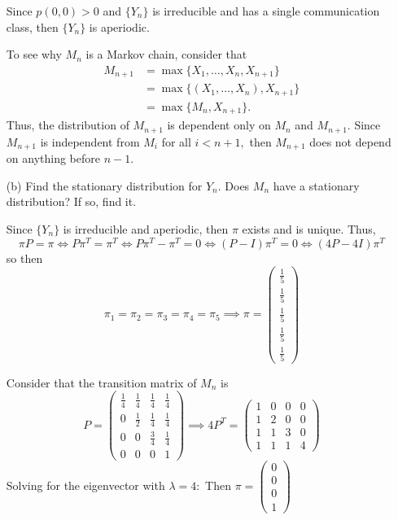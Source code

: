 \documentclass[11pt]{article}
\begin{document}
\begin{enumerate}
\begin{solution}
    Since $p(0,0) > 0$ and $\{Y_n\}$ is irreducible and has a single communication class, then $\{Y_n\}$ is aperiodic. 

    To see why $M_n$ is a Markov chain, consider that 
    \begin{align*}
        M_{n+1} &= \max\{X_1, \dots, X_{n}, X_{n+1}\}\\
        &= \max\{(X_1, \dots, X_{n}), X_{n+1}\}\\
        &= \max\{M_n, X_{n+1}\}.
    \end{align*}
    Thus, the distribution of $M_{n+1}$ is dependent only on $M_n$ and $M_{n+1}.$ Since $M_{n+1}$ is independent from $M_{i}$ for all $i< n+1,$ then $M_{n+1}$ does not depend on anything before $n-1.$ 
    
\end{solution}

    \item[(b)] Find the stationary distribution for $Y_n$. Does $M_n$ have a stationary distribution? If so, find it.
\begin{solution}
    Since $\{Y_n\}$ is irreducible and aperiodic, then $\pi$ exists and is unique. Thus, 
    \[\pi P = \pi \iff P \pi^T = \pi^T \iff P\pi^T - \pi^T = 0 \iff (P - I)\pi^T = 0 \iff (4P - 4I)\pi^T\]
    so then 
    \[\pi_1 = \pi_2 = \pi_3 = \pi_4 = \pi_5 \implies \pi = \begin{pmatrix}
        \frac{1}{5}\\
        \frac{1}{5}\\  
        \frac{1}{5}\\
        \frac{1}{5}\\
        \frac{1}{5}
    \end{pmatrix}\]

    Consider that the transition matrix of $M_n$ is 
    \[P = \begin{pmatrix}
        \frac{1}{4} & \frac{1}{4} & \frac{1}{4} & \frac{1}{4}\\
        0 & \frac{1}{2} & \frac{1}{4} & \frac{1}{4}\\
        0 & 0 & \frac{3}{4} & \frac{1}{4}\\
        0 & 0 & 0  & 1
    \end{pmatrix} \implies 4P^T =\begin{pmatrix}
        1 & 0 & 0 & 0\\
        1 & 2 & 0 & 0\\
        1 & 1 & 3 & 0\\
        1 & 1 & 1 & 4
    \end{pmatrix}\] Solving for the eigenvector with $\lambda = 4:$
    Then $\pi = \begin{pmatrix}
        0 \\ 0 \\ 0 \\ 1
    \end{pmatrix}$
\end{solution}


\end{enumerate}
\end{document}

